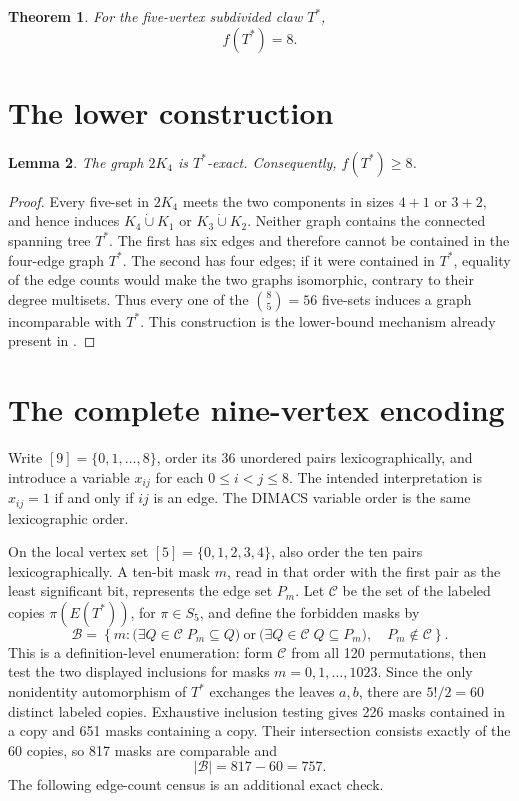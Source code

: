 \documentclass[11pt]{article}
\newtheorem{theorem}{Theorem}
\newtheorem{lemma}[theorem]{Lemma}
\theoremstyle{definition}
\newcommand{\Tstar}{T^{*}}
\begin{document}
\begin{theorem}\label{thm:main}
For the five-vertex subdivided claw \(\Tstar\),
\[
 f(\Tstar)=8.
\]
\end{theorem}

\section{The lower construction}

\begin{lemma}\label{lem:lower}
The graph \(2K_4\) is \(\Tstar\)-exact.  Consequently,
\(f(\Tstar)\geq8\).
\end{lemma}

\begin{proof}
Every five-set in \(2K_4\) meets the two components in sizes \(4+1\) or
\(3+2\), and hence induces \(K_4\mathbin{\dot\cup}K_1\) or
\(K_3\mathbin{\dot\cup}K_2\).  Neither graph contains the connected
spanning tree \(\Tstar\).  The first has six edges and therefore cannot be
contained in the four-edge graph \(\Tstar\).  The second has four edges; if
it were contained in \(\Tstar\), equality of the edge counts would make the
two graphs isomorphic, contrary to their degree multisets.  Thus every one
of the \(\binom85=56\) five-sets induces a graph incomparable with
\(\Tstar\).  This construction is the lower-bound mechanism already present
in \cite{CaroTuzaZarb2026}.
\end{proof}

\section{The complete nine-vertex encoding}

Write \([9]=\{0,1,\ldots,8\}\), order its 36 unordered pairs
lexicographically, and introduce a variable \(x_{ij}\) for each
\(0\leq i<j\leq8\).  The intended interpretation is
\(x_{ij}=1\) if and only if \(ij\) is an edge.  The DIMACS variable order is
the same lexicographic order.

On the local vertex set \([5]=\{0,1,2,3,4\}\), also order the ten pairs
lexicographically.  A ten-bit mask \(m\), read in that order with the first
pair as the least significant bit, represents the edge set \(P_m\).  Let
\(\mathcal C\) be the set of the labeled copies
\(\pi(E(\Tstar))\), for \(\pi\in S_5\), and define the forbidden masks by
\[
 \mathcal B=\left\{m:
   \bigl(\exists Q\in\mathcal C\; P_m\subseteq Q\bigr)
   \ \text{or}\ 
   \bigl(\exists Q\in\mathcal C\; Q\subseteq P_m\bigr),
   \quad P_m\notin\mathcal C
 \right\}.
\]
This is a definition-level enumeration: form \(\mathcal C\) from all 120
permutations, then test the two displayed inclusions for masks
\(m=0,1,\ldots,1023\).  Since the only nonidentity automorphism of
\(\Tstar\) exchanges the leaves \(a,b\), there are \(5!/2=60\) distinct
labeled copies.  Exhaustive inclusion testing gives 226 masks contained in
a copy and 651 masks containing a copy.  Their intersection consists
exactly of the 60 copies, so 817 masks are comparable and
\[
 |\mathcal B|=817-60=757.
\]
The following edge-count census is an additional exact check.
\end{document}

